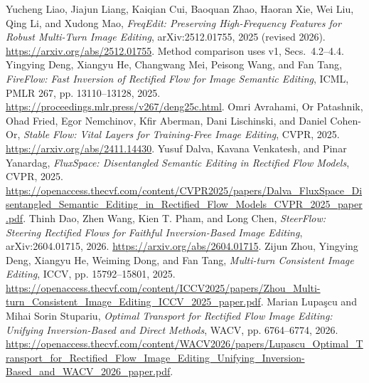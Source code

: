  Yucheng Liao, Jiajun Liang, Kaiqian Cui, Baoquan Zhao, Haoran Xie, Wei Liu, Qing Li, and Xudong Mao, \textit{FreqEdit: Preserving High-Frequency Features for Robust Multi-Turn Image Editing}, arXiv:2512.01755, 2025 (revised 2026). \url{https://arxiv.org/abs/2512.01755}. Method comparison uses v1, Secs.~4.2--4.4.
 Yingying Deng, Xiangyu He, Changwang Mei, Peisong Wang, and Fan Tang, \textit{FireFlow: Fast Inversion of Rectified Flow for Image Semantic Editing}, ICML, PMLR 267, pp. 13110--13128, 2025. \url{https://proceedings.mlr.press/v267/deng25c.html}.
 Omri Avrahami, Or Patashnik, Ohad Fried, Egor Nemchinov, Kfir Aberman, Dani Lischinski, and Daniel Cohen-Or, \textit{Stable Flow: Vital Layers for Training-Free Image Editing}, CVPR, 2025. \url{https://arxiv.org/abs/2411.14430}.
 Yusuf Dalva, Kavana Venkatesh, and Pinar Yanardag, \textit{FluxSpace: Disentangled Semantic Editing in Rectified Flow Models}, CVPR, 2025. \url{https://openaccess.thecvf.com/content/CVPR2025/papers/Dalva_FluxSpace_Disentangled_Semantic_Editing_in_Rectified_Flow_Models_CVPR_2025_paper.pdf}.
 Thinh Dao, Zhen Wang, Kien T. Pham, and Long Chen, \textit{SteerFlow: Steering Rectified Flows for Faithful Inversion-Based Image Editing}, arXiv:2604.01715, 2026. \url{https://arxiv.org/abs/2604.01715}.
 Zijun Zhou, Yingying Deng, Xiangyu He, Weiming Dong, and Fan Tang, \textit{Multi-turn Consistent Image Editing}, ICCV, pp. 15792--15801, 2025. \url{https://openaccess.thecvf.com/content/ICCV2025/papers/Zhou_Multi-turn_Consistent_Image_Editing_ICCV_2025_paper.pdf}.
 Marian Lupa\c{s}cu and Mihai Sorin Stupariu, \textit{Optimal Transport for Rectified Flow Image Editing: Unifying Inversion-Based and Direct Methods}, WACV, pp. 6764--6774, 2026. \url{https://openaccess.thecvf.com/content/WACV2026/papers/Lupascu_Optimal_Transport_for_Rectified_Flow_Image_Editing_Unifying_Inversion-Based_and_WACV_2026_paper.pdf}.
